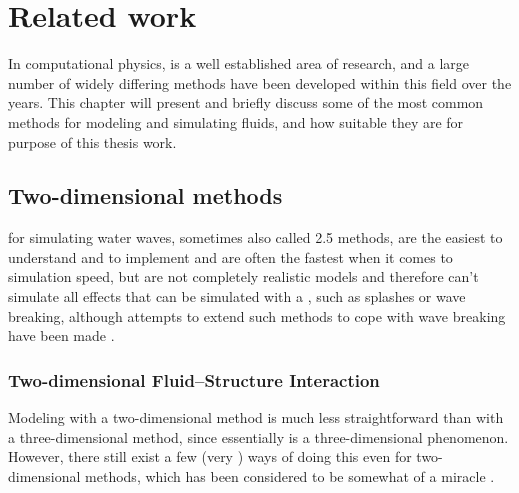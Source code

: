 \chapter{Related work}
\label{chap:relatedwork}


In computational physics, \CFD is a well established area of research, and a large number of widely differing methods have been developed within this field over the years. This chapter will present and briefly discuss some of the most common methods for modeling and simulating fluids, and how suitable they are for purpose of this thesis work.

\section{Two-dimensional methods}

 for simulating water waves, sometimes also called 2.5 methods, are the easiest to understand and to implement and are often the fastest when it comes to simulation speed, but are not completely realistic models and therefore can't simulate all effects that can be simulated with a , such as splashes or wave breaking, although attempts to extend such methods to cope with wave breaking have been made \citep[e.g.][]{Miklos2009}.

\subsection{Two-dimensional Fluid--Structure Interaction}

\label{sec:illumination_model_derivation}

Modeling \FSI with a two-dimensional method is much less straightforward than with a three-dimensional method, since \FSI essentially is a three-dimensional phenomenon. However, there still exist a few (very \approximating) ways of doing this even for two-dimensional methods, which has been considered to be somewhat of a miracle \citep{Tessendorf2004}.


